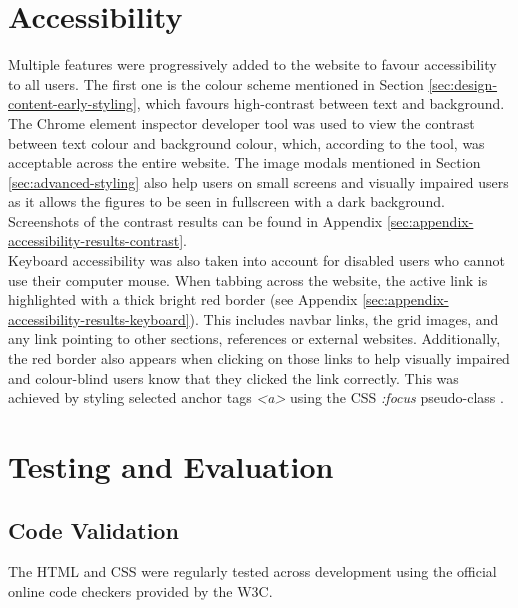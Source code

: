 \documentclass[letterpaper,12pt]{article}
\begin{document}

\section{Accessibility}
\label{sec:accessibility}

Multiple features were progressively added to the website to favour accessibility to all users. The first one is the colour scheme mentioned in Section \ref{sec:design-content-early-styling}, which favours high-contrast between text and background. The Chrome element inspector developer tool was used to view the contrast between text colour and background colour, which, according to the tool, was acceptable across the entire website. The image modals mentioned in Section \ref{sec:advanced-styling} also help users on small screens and visually impaired users as it allows the figures to be seen in fullscreen with a dark background. Screenshots of the contrast results can be found in Appendix \ref{sec:appendix-accessibility-results-contrast}.\\

Keyboard accessibility was also taken into account for disabled users who cannot use their computer mouse. When tabbing across the website, the active link is highlighted with a thick bright red border (see Appendix \ref{sec:appendix-accessibility-results-keyboard}). This includes navbar links, the grid images, and any link pointing to other sections, references or external websites. Additionally, the red border also appears when clicking on those links to help visually impaired and colour-blind users know that they clicked the link correctly. This was achieved by styling selected anchor tags \textit{\textless a\textgreater} using the CSS \textit{:focus} pseudo-class \cite{css-focus}.


\section{Testing and Evaluation}
\label{sec:testing-evaluation}

\subsection{Code Validation}

The HTML and CSS were regularly tested across development using the official online code checkers provided by the W3C.
\end{document}

